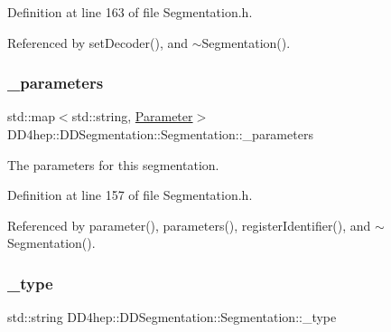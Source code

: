 Definition at line 163 of file Segmentation.\+h.



Referenced by set\+Decoder(), and $\sim$\+Segmentation().

\hypertarget{class_d_d4hep_1_1_d_d_segmentation_1_1_segmentation_a7ede8a80772ee04c5997696734f0c200}{}\label{class_d_d4hep_1_1_d_d_segmentation_1_1_segmentation_a7ede8a80772ee04c5997696734f0c200} 
\subsubsection{\texorpdfstring{\+\_\+parameters}{\_parameters}}
{\footnotesize\ttfamily std\+::map$<$std\+::string, \hyperlink{namespace_d_d4hep_1_1_d_d_segmentation_af6c6bad2a745d807a0ed00506fb34ccf}{Parameter}$>$ D\+D4hep\+::\+D\+D\+Segmentation\+::\+Segmentation\+::\+\_\+parameters\hspace{0.3cm}{\ttfamily [protected]}}



The parameters for this segmentation. 



Definition at line 157 of file Segmentation.\+h.



Referenced by parameter(), parameters(), register\+Identifier(), and $\sim$\+Segmentation().

\hypertarget{class_d_d4hep_1_1_d_d_segmentation_1_1_segmentation_a3dab8fc421e90851cc45b20b90754271}{}\label{class_d_d4hep_1_1_d_d_segmentation_1_1_segmentation_a3dab8fc421e90851cc45b20b90754271} 
\subsubsection{\texorpdfstring{\+\_\+type}{\_type}}
{\footnotesize\ttfamily std\+::string D\+D4hep\+::\+D\+D\+Segmentation\+::\+Segmentation\+::\+\_\+type\hspace{0.3cm}{\ttfamily [protected]}}



